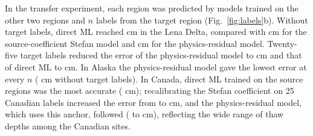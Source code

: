 
In the transfer experiment, each region was predicted by models trained on the other two regions and $n$ labels from the target region (Fig.~\ref{fig:labels}b). Without target labels, direct ML reached \ntlrmseLeDszero{} cm in the Lena Delta, compared with \ntlrmseLePzzero{} cm for the source-coefficient Stefan model and \ntlrmseLeRszero{} cm for the physics-residual model. Twenty-five target labels reduced the error of the physics-residual model to \ntlrmseLeRstwfive{} cm and that of direct ML to \ntlrmseLeDstwfive{} cm. In Alaska the physics-residual model gave the lowest error at every $n$ (\ntlrmseAkRszero{} cm without target labels). In Canada, direct ML trained on the source regions was the most accurate (\ntlrmseCaDszero{} cm); recalibrating the Stefan coefficient on 25 Canadian labels increased the error from \ntlrmseCaPzzero{} to \ntlrmseCaPntwfive{} cm, and the physics-residual model, which uses this anchor, followed (\ntlrmseCaRszero{} to \ntlrmseCaRstwfive{} cm), reflecting the wide range of thaw depths among the Canadian sites.

